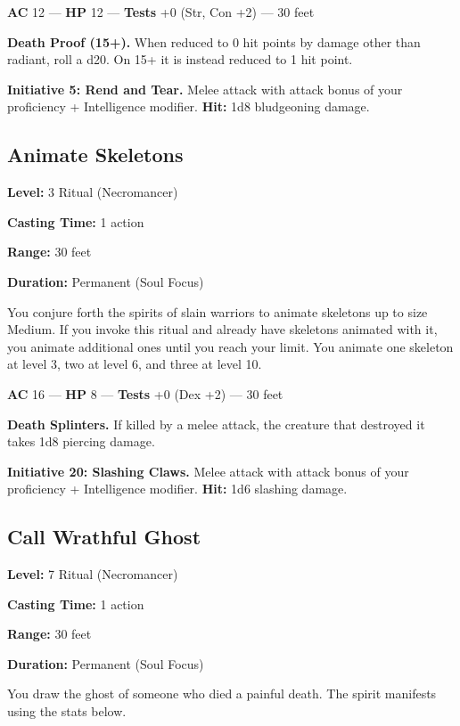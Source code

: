 \documentclass[12pt,letterpaper,twocolumn,openany,nodeprecatedcode,bg=none]{dndbook}
\let\oldsubsection\subsection
\renewcommand{\subsection}[1]{%
  \needspace{5\baselineskip}%
  \oldsubsection{#1}%
}
\begin{document}
\textbf{AC} 12 --- \textbf{HP} 12 --- \textbf{Tests} +0 (Str, Con +2)
--- 30 feet

\textbf{Death Proof (15+).} When reduced to 0 hit points by damage other
than radiant, roll a d20. On 15+ it is instead reduced to 1 hit point.

\textbf{Initiative 5: Rend and Tear.} Melee attack with attack bonus of
your proficiency + Intelligence modifier. \textbf{Hit:} 1d8 bludgeoning
damage.

\newpage

\subsection{Animate Skeletons}\label{animate-skeletons}

\textbf{Level:} 3 Ritual (Necromancer)

\textbf{Casting Time:} 1 action

\textbf{Range:} 30 feet

\textbf{Duration:} Permanent (Soul Focus)

You conjure forth the spirits of slain warriors to animate skeletons up
to size Medium. If you invoke this ritual and already have skeletons
animated with it, you animate additional ones until you reach your
limit. You animate one skeleton at level 3, two at level 6, and three at
level 10.

\textbf{AC} 16 --- \textbf{HP} 8 --- \textbf{Tests} +0 (Dex +2) --- 30
feet

\textbf{Death Splinters.} If killed by a melee attack, the creature that
destroyed it takes 1d8 piercing damage.

\textbf{Initiative 20: Slashing Claws.} Melee attack with attack bonus
of your proficiency + Intelligence modifier. \textbf{Hit:} 1d6 slashing
damage.

\subsection{Call Wrathful Ghost}\label{call-wrathful-ghost}

\textbf{Level:} 7 Ritual (Necromancer)

\textbf{Casting Time:} 1 action

\textbf{Range:} 30 feet

\textbf{Duration:} Permanent (Soul Focus)

You draw the ghost of someone who died a painful death. The spirit
manifests using the stats below.
\end{document}
